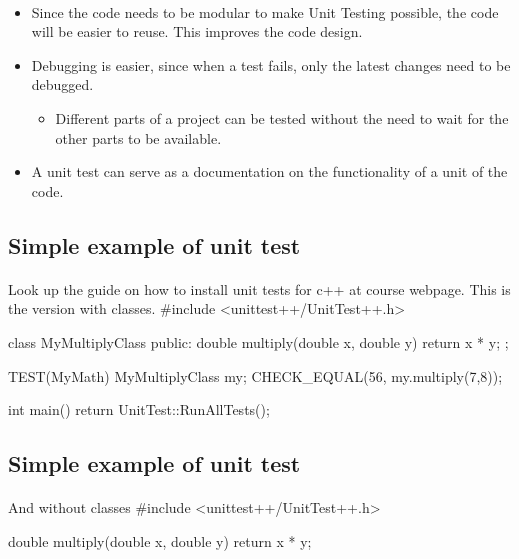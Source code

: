 \documentclass[%
twoside,                 %
final,                   %
10pt]{article}
\newenvironment{paragraphadmon}[1][]{\paragraph{#1}}{}
\begin{document}
{{{{{{{{{{\begin{paragraphadmon}[]
\begin{itemize}
  \item Since the code needs to be modular to make Unit Testing possible, the code will be easier to reuse. This improves the code design.

  \item Debugging is easier, since when a test fails, only the latest changes need to be debugged.
\begin{itemize}

   \item Different parts of a project can be tested without the need to wait for the other parts to be available.

\end{itemize}

\noindent
  \item A unit test can serve as a documentation on the functionality of a unit of the code.
\end{itemize}

\noindent
\end{paragraphadmon}




\subsection{Simple example of unit test}

\begin{paragraphadmon}[]
Look up the guide on how to install unit tests for c++ at course webpage. This is the version with classes.
\bcppcod
#include <unittest++/UnitTest++.h>

class MyMultiplyClass{
public:
    double multiply(double x, double y) {
        return x * y;
    }
};

TEST(MyMath) {
    MyMultiplyClass my;
    CHECK_EQUAL(56, my.multiply(7,8));
}

int main()
{
    return UnitTest::RunAllTests();
}
\ecppcod
\end{paragraphadmon}



\subsection{Simple example of unit test}

\begin{paragraphadmon}[]
And without classes
\bcppcod
#include <unittest++/UnitTest++.h>


double multiply(double x, double y) {
    return x * y;
}


\end{paragraphadmon}}}}}}}}}}}
\end{document}
